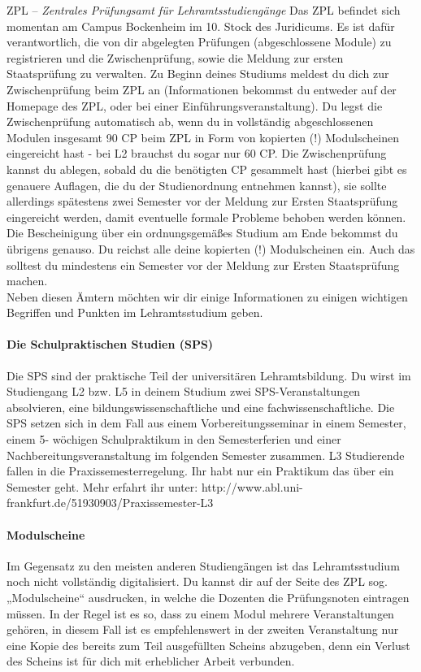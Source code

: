 ZPL – \textit{Zentrales Prüfungsamt für Lehramtsstudiengänge}
Das ZPL befindet sich momentan am Campus Bockenheim im 10. Stock des Juridicums. Es ist dafür verantwortlich, die von dir abgelegten Prüfungen (abgeschlossene Module) zu registrieren und die Zwischenprüfung, sowie die Meldung zur ersten Staatsprüfung zu verwalten.
Zu Beginn deines Studiums meldest du dich zur Zwischenprüfung beim ZPL an (Informationen bekommst du entweder auf der Homepage des ZPL, oder bei einer Einführungsveranstaltung). Du legst die Zwischenprüfung automatisch ab, wenn du in vollständig abgeschlossenen Modulen insgesamt 90 CP beim ZPL in Form von kopierten (!) Modulscheinen eingereicht hast - bei L2 brauchst du sogar nur 60 CP.
Die Zwischenprüfung kannst du ablegen, sobald du die benötigten CP gesammelt hast (hierbei gibt es genauere Auflagen, die du der Studienordnung entnehmen kannst), sie sollte allerdings spätestens zwei Semester vor der Meldung zur Ersten Staatsprüfung eingereicht werden, damit eventuelle formale Probleme behoben werden können.
Die Bescheinigung über ein ordnungsgemäßes Studium am Ende bekommst du übrigens genauso. Du reichst alle deine kopierten (!) Modulscheinen ein. Auch das solltest du mindestens ein Semester vor der Meldung zur Ersten Staatsprüfung machen.\\

Neben diesen Ämtern möchten wir dir einige Informationen zu einigen wichtigen Begriffen und Punkten im Lehramtsstudium geben.

\paragraph{Die Schulpraktischen Studien (SPS)}
Die SPS sind der praktische Teil der universitären Lehramtsbildung. Du wirst im Studiengang L2 bzw. L5 in deinem Studium zwei SPS-Veranstaltungen absolvieren, eine bildungswissenschaftliche und eine fachwissenschaftliche. Die SPS setzen sich in dem Fall aus einem Vorbereitungsseminar in einem Semester, einem 5- wöchigen Schulpraktikum in den Semesterferien und einer Nachbereitungsveranstaltung im folgenden Semester zusammen.
L3 Studierende fallen in die Praxissemesterregelung. Ihr habt nur ein Praktikum das über ein Semester geht. Mehr erfahrt ihr unter: http://www.abl.uni-frankfurt.de/51930903/Praxissemester-L3

\paragraph{Modulscheine}
Im Gegensatz zu den meisten anderen Studiengängen ist das Lehramtsstudium noch nicht vollständig digitalisiert. Du kannst dir auf der Seite des ZPL sog. „Modulscheine“ ausdrucken, in welche die Dozenten die Prüfungsnoten eintragen müssen.
In der Regel ist es so, dass zu einem Modul mehrere Veranstaltungen gehören, in diesem Fall ist es empfehlenswert in der zweiten Veranstaltung nur eine Kopie des bereits zum Teil ausgefüllten Scheins abzugeben, denn ein Verlust des Scheins ist für dich mit erheblicher Arbeit verbunden.

